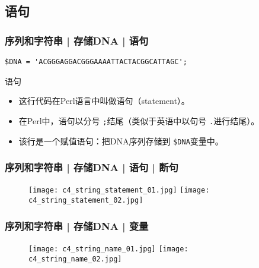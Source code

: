 \subsection{语句}
\begin{frame}[fragile]
  \frametitle{序列和字符串 | 存储DNA | \alert{语句}}
\begin{lstlisting}
$DNA = 'ACGGGAGGACGGGAAAATTACTACGGCATTAGC';
\end{lstlisting}
\pause
\begin{block}{语句}
  \begin{itemize}
    \item 这行代码在Perl语言中叫做语句（statement）。
    \item 在Perl中，语句以分号 \verb|;|结尾（类似于英语中以句号 \verb|.|进行结尾）。
    \item 该行是一个赋值语句：把DNA序列存储到 \verb|$DNA|变量中。
  \end{itemize}
\end{block}
\end{frame}

\begin{frame}
  \frametitle{序列和字符串 | 存储DNA | 语句 | 断句}
  \begin{figure}
    \centering
    \texttt{[image: c4\_string\_statement\_01.jpg]}
    \quad
    \texttt{[image: c4\_string\_statement\_02.jpg]}
  \end{figure}
\end{frame}

\begin{frame}
  \frametitle{序列和字符串 | 存储DNA | 变量}
  \begin{figure}
    \centering
    \texttt{[image: c4\_string\_name\_01.jpg]}
    \quad
    \texttt{[image: c4\_string\_name\_02.jpg]}
  \end{figure}
\end{frame}

